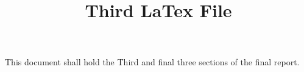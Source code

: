 \documentclass[12pt,A4paper]{article}
\author{}
\date{}
\begin{document}
	\title{Third LaTex File}
	\maketitle
This document shall hold the Third and final three sections of the final report.
\end{document}
